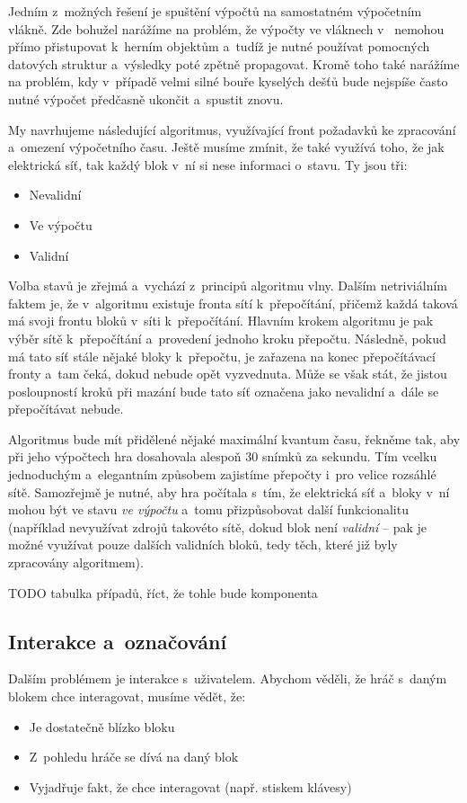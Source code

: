 Jedním z~možných řešení je spuštění výpočtů na samostatném výpočetním vlákně. Zde bohužel narážíme na problém, že výpočty ve vláknech v~\UEu{} nemohou přímo přistupovat k~herním objektům a~tudíž je nutné používat pomocných datových struktur a~výsledky poté zpětně propagovat. Kromě toho také narážíme na problém, kdy v~případě velmi silné bouře kyselých dešťů bude nejspíše často nutné výpočet předčasně ukončit a~spustit znovu.

My navrhujeme následující algoritmus, využívající front požadavků ke zpracování a~omezení výpočetního času. Ještě musíme zmínit, že také využívá toho, že jak elektrická síť, tak každý blok v~ní si nese informaci o~stavu. Ty jsou tři:
\begin{itemize}
	\item Nevalidní
	\item Ve výpočtu
	\item Validní
\end{itemize}
Volba stavů je zřejmá a~vychází z~principů algoritmu vlny. Dalším netriviálním faktem je, že v~algoritmu existuje fronta sítí k~přepočítání, přičemž každá taková má svoji frontu bloků v~síti k~přepočítání. Hlavním krokem algoritmu je pak výběr sítě k~přepočítání a~provedení jednoho kroku přepočtu. Následně, pokud má tato síť stále nějaké bloky k~přepočtu, je zařazena na konec přepočítávací fronty a~tam čeká, dokud nebude opět vyzvednuta. Může se však stát, že jistou posloupností kroků při mazání bude tato síť označena jako nevalidní a~dále se přepočítávat nebude.

Algoritmus bude mít přidělené nějaké maximální kvantum času, řekněme tak, aby při jeho výpočtech hra dosahovala alespoň 30 snímků za sekundu. Tím vcelku jednoduchým a~elegantním způsobem zajistíme přepočty i~pro velice rozsáhlé sítě. Samozřejmě je nutné, aby hra počítala s~tím, že elektrická síť a~bloky v~ní mohou být ve stavu \textit{ve výpočtu} a~tomu přizpůsobovat další funkcionalitu (například nevyužívat zdrojů takovéto sítě, dokud blok není \textit{validní} -- pak je možné využívat pouze dalších validních bloků, tedy těch, které již byly zpracovány algoritmem).

TODO tabulka případů, říct, že tohle bude komponenta

\subsection{Interakce a~označování}
\label{subsec:interaction}

Dalším problémem je interakce s~uživatelem. Abychom věděli, že hráč s~daným blokem chce interagovat, musíme vědět, že:
\begin{itemize}
	\item Je dostatečně blízko bloku
	\item Z~pohledu hráče se dívá na daný blok 
	\item Vyjadřuje fakt, že chce interagovat (např. stiskem klávesy)
\end{itemize}



